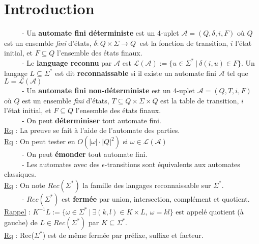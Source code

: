 \documentclass[11pt,a4paper]{article}
\begin{document}
\section{Introduction}
\ \ \ \ \ - Un \textbf{automate fini déterministe} est un 4-uplet $\mathcal{A} = (Q,\delta, i, F)$ où $Q$ est un ensemble \textit{fini} d'états, $\delta : Q \times \Sigma \to Q \ $ est la fonction de transition, $i$ l'état initial, et $F \subseteq Q$ l'ensemble des états finaux. \\

\ \ \ \ \ - Le \textbf{language reconnu} par $\mathcal{A}$ est $\mathcal{L}(\mathcal{A}) := \{u \in \Sigma^* \ | \ \delta(i,u) \in F\}$. Un langage $L \subseteq \Sigma^*$ est dit \textbf{reconnaissable} si il existe un automate fini $\mathcal{A}$ tel que $L = \mathcal{L}(\mathcal{A})$\\

\ \ \ \ \ - Un \textbf{automate fini non-déterministe} est un 4-uplet $\mathcal{A} = (Q,T, i, F)$ où $Q$ est un ensemble \textit{fini} d'états, $ T \subseteq Q \times \Sigma	\times Q$ est la table de transition, $i$ l'état initial, et $F \subseteq Q$ l'ensemble des états finaux. \\

\ \ \ \ \ - On peut \textbf{déterminiser} tout automate fini. \\

\underline{Rq} : La preuve se fait à l'aide de l'automate des parties. \\
\underline{Rq} : On peut tester en $O(|\omega|\cdot|Q|^2)$ si $\omega \in \mathcal{L}(\mathcal{A})$\\

\ \ \ \ \ - On peut \textbf{émonder} tout automate fini. \\

\ \ \ \ \ - Les automates avec des $\epsilon$-transitions sont équivalents aux automates classiques.  \\

\underline{Rq} : On note $Rec(\Sigma^*)$ la famille des langages reconnaissable sur $\Sigma^*$. \\

\ \ \ \ \ - $Rec(\Sigma^*)$ est \textbf{fermée} par union, intersection, complément et quotient. \\

\underline{Rappel} : $K^{-1}L := \{\omega \in \Sigma^*\ | \ \exists (k,l) \in K\times L, \ \omega =kl \}$ est appelé quotient (à gauche) de $L \in Rec(\Sigma^*)$ par $K \subseteq \Sigma^*$.  \\
\underline{Rq} : Rec($\Sigma^*$) est de même fermée par préfixe, suffixe et facteur. \\
\end{document}
